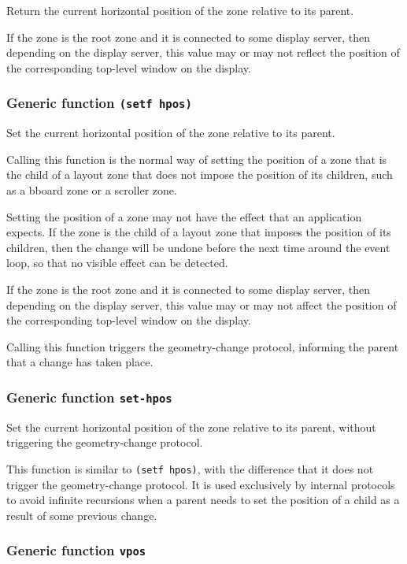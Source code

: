 \documentclass{report}
\begin{document}
Return the current horizontal position of the zone relative to its
parent.  

If the zone is the root zone and it is connected to some display
server, then depending on the display server, this value may or
may not reflect the position of the corresponding top-level
window on the display. 

\subsubsection{Generic function \texttt{(setf hpos)}}

Set the current horizontal position of the zone relative to its
parent.  

Calling this function is the normal way of setting the position of
a zone that is the child of a layout zone that does not impose the
position of its children, such as a bboard zone or a scroller
zone.

Setting the position of a zone may not have the effect that an
application expects.  If the zone is the child of a layout zone
that imposes the position of its children, then the change will be
undone before the next time around the event loop, so that no
visible effect can be detected.  

If the zone is the root zone and it is connected to some display
server, then depending on the display server, this value may or
may not affect the position of the corresponding top-level window
on the display.

Calling this function triggers the geometry-change protocol,
informing the parent that a change has taken place.  

\subsubsection{Generic function \texttt{set-hpos}}

Set the current horizontal position of the zone relative to its
parent, without triggering the geometry-change protocol.

This function is similar to \texttt{(setf hpos)}, with the difference
that it does not trigger the geometry-change protocol.  It is used
exclusively by internal protocols to avoid infinite recursions when a
parent needs to set the position of a child as a result of some
previous change.

\subsubsection{Generic function \texttt{vpos}}
\end{document}

